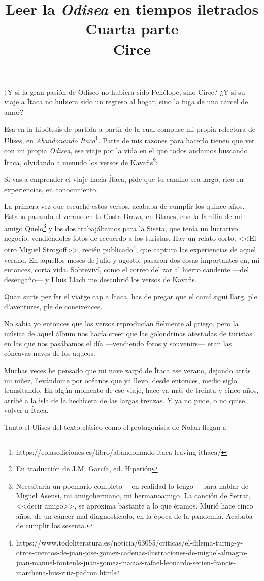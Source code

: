 \documentclass[11pt,a4paper]{article}
\title{Leer la \emph{Odisea} en tiempos iletrados \\ Cuarta parte \\ Circe}
\author{}
\date{}
\begin{document}
\maketitle

¿Y si  la gran pasión de Odiseo no hubiera sido Penélope, sino Circe? ¿Y si su viaje a Ítaca no hubiera sido un regreso al hogar, sino la fuga de una cárcel de amor?

Esa en la hipótesis de partida a partir de la cual compuse mi propia relectura de Ulises, en \emph{Abandonando Itaca}\footnote{https://eolasediciones.es/libro/abandonando-itaca-leaving-ithaca/}. Parte de mis razones para hacerlo tienen que ver con mi propia \emph{Odisea}, ese viaje por la vida en el que todos andamos buscando Ítaca, olvidando a menudo los versos de Kavafis\footnote{En traducción de J.M. García, ed. Hiperión}:

Si vas a emprender el viaje hacia Ítaca,
pide que tu camino sea largo,
rico en experiencias, en conocimiento. 

La primera vez que escuché estos versos, acababa de cumplir los quince años. Estaba pasando el verano en la Costa Brava, en Blanes, con la familia de mi amigo Quelo\footnote{Necesitaría un poemario completo ---en realidad lo tengo--- para hablar de Miguel Asensi, mi amigohermano, mi hermanoamigo. La canción de Serrat, <<decir amigo>>, se aproxima bastante a lo que éramos. Murió hace cinco años, de un cáncer mal diagnosticado, en la época de la pandemia. Acababa de cumplir los sesenta.} y los dos trabajábamos para la Siseta, que tenía un lucrativo negocio, vendiéndoles fotos de recuerdo a los turistas. Hay un relato corto, <<El otro Miguel Strogoff>>, recién publicado\footnote{https://www.todoliteratura.es/noticia/63055/criticas/el-dilema-turing-y-otros-cuentos-de-juan-jose-gomez-cadenas-ilustraciones-de-miguel-almagro-juan-manuel-fontenls-juan-gomez-macias-rafael-leonardo-setien-francis-marchena-luis-ruiz-padron.html}, que captura las experiencias de aquel verano. En aquellos meses de julio y agosto, pasaron dos cosas importantes en, mi entonces, corta vida. Sobreviví, como el correo del zar al hierro candente ---del desengaño--- y Lluis Llach me descubrió los versos de Kavafis. 

Quan surts per fer el viatge cap a Itaca,
has de pregar que el camí sigui llarg,
ple d'aventures, ple de coneixences.

No sabía yo entonces que los versos reproducían fielmente al griego, pero la música de aquel álbum nos hacía creer que las golondrinas atestadas de turistas en las que nos pasábamos el día ---vendiendo fotos y souvenirs--- eran las cóncavas naves de los aqueos. 

Muchas veces he pensado que mi nave zarpó de Ítaca ese verano, dejando atrás mi niñez, llevándome por océanos que ya llevo, desde entonces, medio siglo transitando. En algún momento de ese viaje, hace ya más de treinta y cinco años, arribé a la isla de la hechicera de las largas trenzas. Y ya no pude, o no quise, volver a Ítaca.

Tanto el Ulises del texto clásico como el protagonista de Nolan llegan a 



  
\end{document}
